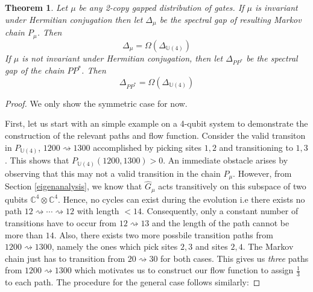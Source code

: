 \documentclass[12pt]{amsart}
\newtheorem{theorem}{Theorem}[section]
\theoremstyle{definition}
\theoremstyle{remark}
\numberwithin{equation}{section}
\theoremstyle{remark}
\begin{document}
\begin{theorem} \label{gapbound}
  Let $\mu$ be any 2-copy gapped distribution of gates. If $\mu$ is invariant under Hermitian conjugation then let $\Delta_\mu$ be the spectral gap of resulting Markov chain $P_\mu$. Then
  \begin{equation}
    \Delta_\mu = \Omega(\Delta_{\mathbb{U}(4)})
  \end{equation}
  If $\mu$ is not invariant under Hermitian conjugation, then let $\Delta_{PP^*}$ be the spectral gap of the chain $PP^*$. Then
  \begin{equation}
    \Delta_{PP^*} = \Omega(\Delta_{\mathbb{U}(4)})
  \end{equation}
\end{theorem}
\begin{proof}
  We only show the symmetric case for now. \newline

  First, let us start with an simple example on a 4-qubit system to demonstrate the construction of the relevant paths and flow function. Consider the valid transiton in $P_{\mathbb{U}(4)}$, $1200 \rightsquigarrow 1300$ accomplished by picking sites $1,2$ and transitioning to $1,3$. This shows that $P_{\mathbb{U}(4)}(1200,1300) > 0$. An immediate obstacle arises by observing that this may not a valid transition in the chain $P_\mu$. However, from Section \ref{eigenanalysis}, we know that $\hat{G}_{\mu}$ acts transitively on this subspace of two qubits $\mathbb{C}^4 \otimes \mathbb{C}^4$. Hence, no cycles can exist during the evolution i.e there exists no path $12 \rightsquigarrow \cdots \rightsquigarrow 12$ with length $< 14$. Consequently, only a constant number of transitions have to occur from $12 \rightsquigarrow 13$ and the length of the path cannot be more than $14$. Also, there exists two more possbile transition paths from $1200 \rightsquigarrow 1300$, namely the ones which pick sites $2,3$ and sites $2,4$. The Markov chain just has to transition from $20 \rightsquigarrow 30$ for both cases. This gives us \emph{three} paths from $1200 \rightsquigarrow 1300$ which motivates us to construct our flow function to assign $\frac{1}{3}$ to each path. The procedure for the general case follows similarly: \newline


\end{proof}
\end{document}
